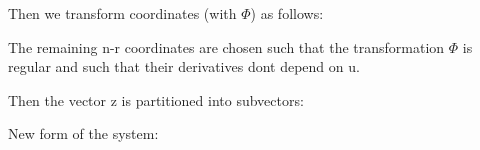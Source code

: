 \documentclass[10pt,a4paper]{scrartcl}
\begin{document}
\begin{multicols*}{3}

Then we transform coordinates (with $\Phi$) as follows:


The remaining n-r coordinates are chosen such that the transformation $\Phi$ is regular and such that their derivatives dont depend on u.


Then the vector z is partitioned into subvectors:


New form of the system:


\end{multicols*}
\end{document}
